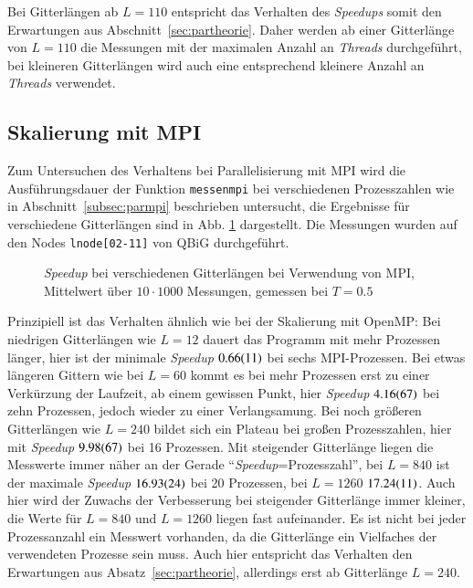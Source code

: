 	
	Bei Gitterlängen ab $L=110$ entspricht das Verhalten des \textit{Speedups} somit den Erwartungen aus Abschnitt~\ref{sec:partheorie}. Daher werden ab einer Gitterlänge von $L=110$ die Messungen mit der maximalen Anzahl an \textit{Threads} durchgeführt, bei kleineren Gitterlängen wird auch eine entsprechend kleinere Anzahl an \textit{Threads} verwendet. 
	
	\subsection{Skalierung mit MPI}
	\label{subsec:ergebnissempi}
	
	Zum Untersuchen des Verhaltens bei Parallelisierung mit MPI wird die Ausführungsdauer der Funktion \texttt{messenmpi} bei verschiedenen Prozesszahlen wie in Abschnitt~\ref{subsec:parmpi} beschrieben untersucht, die Ergebnisse für verschiedene Gitterlängen sind in Abb. \ref{fig:skalierunglaengempi} dargestellt. Die Messungen wurden auf den Nodes \texttt{lnode[02-11]} von QBiG durchgeführt.
	
		\begin{figure}[htbp]
			
			\caption[\textit{Speedup} bei verschiedenen Gitterlängen bei Verwendung von MPI]{\textit{Speedup} bei verschiedenen Gitterlängen bei Verwendung von MPI, Mittelwert über $10 \cdot 1000$ Messungen, gemessen bei $T=\num{0,5}$}
			\label{fig:skalierunglaengempi}
		\end{figure}
		
	Prinzipiell ist das Verhalten ähnlich wie bei der Skalierung mit OpenMP: Bei niedrigen Gitterlängen wie $L=12$ dauert das Programm mit mehr Prozessen länger, hier ist der minimale \textit{Speedup} $\num{0,66\pm0,11}$ bei sechs MPI-Prozessen. Bei etwas längeren Gittern wie bei $L=60$ kommt es bei mehr Prozessen erst zu einer Verkürzung der Laufzeit, ab einem gewissen Punkt, hier \textit{Speedup} $\num{4,16\pm0,67}$ bei zehn Prozessen, jedoch wieder zu einer Verlangsamung. Bei noch größeren Gitterlängen wie $L=240$ bildet sich ein Plateau bei großen Prozesszahlen, hier mit \textit{Speedup} $\num{9,98\pm 0,67}$ bei 16 Prozessen. Mit steigender Gitterlänge liegen die Messwerte immer näher an der Gerade \enquote{\textit{Speedup}=Prozesszahl}, bei $L=840$ ist der maximale \textit{Speedup} $\num{16,93\pm0,24}$ bei 20 Prozessen, bei $L=1260$ $\num{17,24\pm0,11}$. Auch hier wird der Zuwachs der Verbesserung bei steigender Gitterlänge immer kleiner, die Werte für $L=840$ und $L=1260$ liegen fast aufeinander. Es ist nicht bei jeder Prozessanzahl ein Messwert vorhanden, da die Gitterlänge ein Vielfaches der verwendeten Prozesse sein muss.
	Auch hier entspricht das Verhalten den Erwartungen aus Absatz~\ref{sec:partheorie}, allerdings erst ab Gitterlänge $L=240$.

